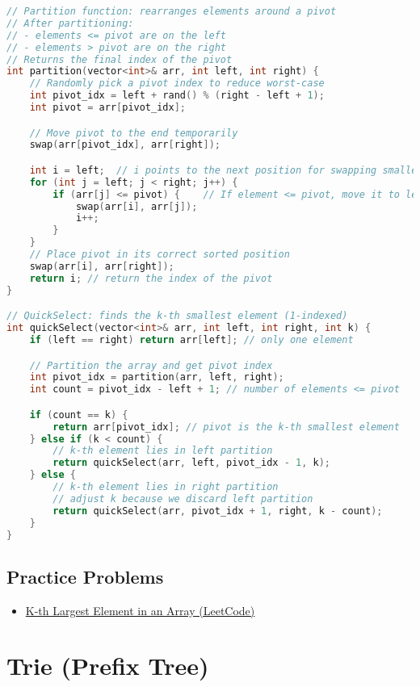 \documentclass[12pt]{article}
\begin{document}
\begin{lstlisting}[language=C++]
// Partition function: rearranges elements around a pivot
// After partitioning:
// - elements <= pivot are on the left
// - elements > pivot are on the right
// Returns the final index of the pivot
int partition(vector<int>& arr, int left, int right) {
    // Randomly pick a pivot index to reduce worst-case
    int pivot_idx = left + rand() % (right - left + 1);
    int pivot = arr[pivot_idx];

    // Move pivot to the end temporarily
    swap(arr[pivot_idx], arr[right]);

    int i = left;  // i points to the next position for swapping smaller elements
    for (int j = left; j < right; j++) {
        if (arr[j] <= pivot) {    // If element <= pivot, move it to left
            swap(arr[i], arr[j]);
            i++;
        }
    }
    // Place pivot in its correct sorted position
    swap(arr[i], arr[right]);
    return i; // return the index of the pivot
}

// QuickSelect: finds the k-th smallest element (1-indexed)
int quickSelect(vector<int>& arr, int left, int right, int k) {
    if (left == right) return arr[left]; // only one element

    // Partition the array and get pivot index
    int pivot_idx = partition(arr, left, right);
    int count = pivot_idx - left + 1; // number of elements <= pivot

    if (count == k) {
        return arr[pivot_idx]; // pivot is the k-th smallest element
    } else if (k < count) {
        // k-th element lies in left partition
        return quickSelect(arr, left, pivot_idx - 1, k);
    } else {
        // k-th element lies in right partition
        // adjust k because we discard left partition
        return quickSelect(arr, pivot_idx + 1, right, k - count);
    }
}
\end{lstlisting}

\subsection{Practice Problems}
\begin{itemize}
    \item \href{https://leetcode.com/problems/kth-largest-element-in-an-array/}{K-th Largest Element in an Array (LeetCode)}
\end{itemize}

\section{Trie (Prefix Tree)}
\end{document}
